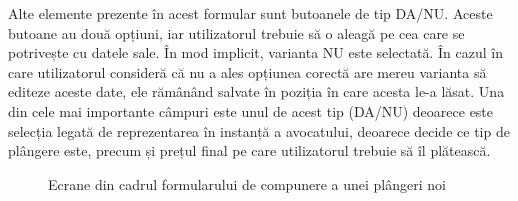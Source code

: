 \documentclass[12pt,a4paper]{report}
\theoremstyle{definition}
\theoremstyle{remark}
\begin{document}
Alte elemente prezente în acest formular sunt butoanele de tip DA/NU. Aceste butoane au două opțiuni, iar utilizatorul trebuie să o aleagă pe cea care se potrivește cu datele sale. În mod implicit, varianta NU este selectată. În cazul în care utilizatorul consideră că nu a ales opțiunea corectă are mereu varianta să editeze aceste date, ele rămânând salvate în poziția în care acesta le-a lăsat. Una din cele mai importante câmpuri este unul de acest tip (DA/NU) deoarece este selecția legată de reprezentarea în instanță a avocatului, deoarece decide ce tip de plângere este, precum și prețul final pe care utilizatorul trebuie să îl plătească.
\begin{figure}[H]
  \centering
  \hspace{2.0cm}
  \caption{Ecrane din cadrul formularului de compunere a unei plângeri noi}
\end{figure}
\end{document}
